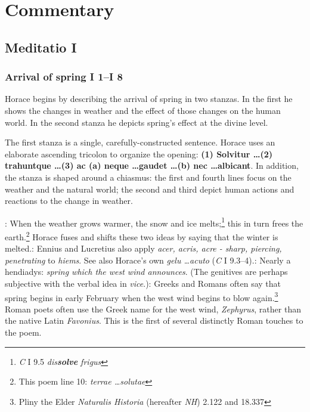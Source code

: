 \chapter*{Commentary}

\section*{Meditatio I}

\subsection*{Arrival of spring I 1--I 8}

Horace begins by describing the arrival of spring in two stanzas.  In the first he shows the changes in weather and the effect of those changes on the human world.  In the second stanza he depicts spring's effect at the divine level.


The first stanza is a single, carefully-constructed sentence.  Horace uses an elaborate ascending tricolon to organize the opening: \textbf{(1) Solvitur \dots (2) trahuntque \dots (3) ac (a) neque \dots gaudet \dots (b) nec \dots albicant}.  In addition, the stanza is shaped around a chiasmus: the first and fourth lines focus on the weather and the natural world; the second and third depict human actions and reactions to the change in weather. 


: When the weather grows warmer, the snow and ice melts;\footnote{\textit{C} I 9.5 \textit{dis\textbf{solve} frigus}} this in turn frees the earth.\footnote{This poem line 10: \textit{terrae \dots solutae}}  Horace fuses and shifts these two ideas by saying that the winter is melted.\indent{}: Ennius and Lucretius also apply \textit{acer, acris, acre - sharp, piercing, penetrating} to \textit{hiems}. See also Horace's own \textit{gelu \dots acuto} (\textit{C} I 9.3--4).\indent{}: Nearly a hendiadys: \textit{spring which the west wind announces}.  (The genitives are perhaps subjective with the verbal idea in \textit{vice}.)\indent{}: Greeks and Romans often say that spring begins in early February when the west wind begins to blow again.\footnote{Pliny the Elder \textit{Naturalis Historia} (hereafter \textit{NH}) 2.122 and 18.337}  Roman poets often use the Greek name for the west wind, \textit{Zephyrus}, rather than the native Latin \textit{Favonius}.  This is the first of several distinctly Roman touches to the poem.

